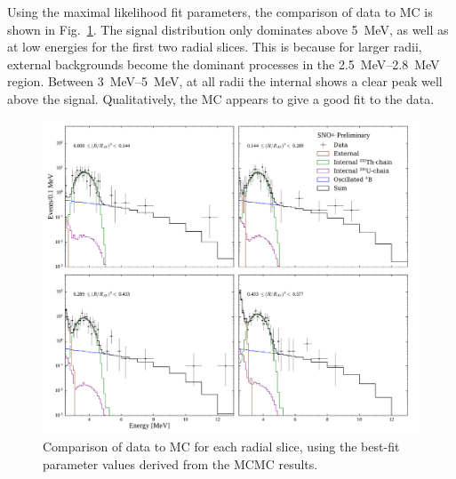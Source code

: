 Using the maximal likelihood fit parameters, the comparison of data to MC is shown in Fig.~\ref{fig:solar_data_mc_slices_comparison}. The \beight{} signal distribution only dominates above \SI{5}{\MeV}, as well as at low energies for the first two radial slices. This is because for larger radii, external backgrounds become the dominant processes in the \SIrange{2.5}{2.8}{\MeV} region. Between \SIrange{3}{5}{\MeV}, at all radii the internal  shows a clear peak well above the \beight{} signal. Qualitatively, the MC appears to give a good fit to the data.

\begin{figure}[!th]
    \centering
    \includegraphics[width=\textwidth]{6_SolarAnalysis/images/data_mc_fit_plot_1D_energy_r3_slices_log_maxlh_tannerstyle_2.pdf}
    \caption[Comparison of data to MC for each radial slice]
    {Comparison of data to MC for each radial slice, using the best-fit parameter values derived from the MCMC results.}
    \label{fig:solar_data_mc_slices_comparison}
\end{figure}


